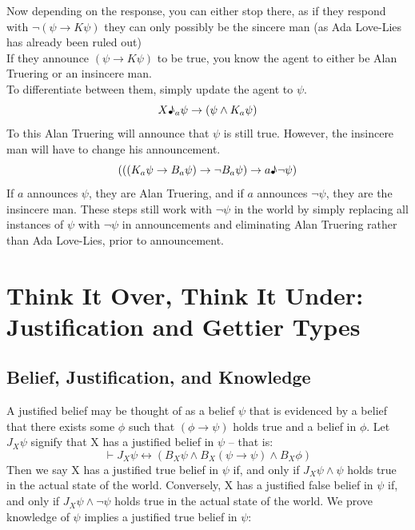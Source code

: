 \documentclass[12pt, titlepage, twoside, a4paper]{report}
\begin{document}
\newline \newline \newline \newline \newline \newline \newline \newline \newline
Now depending on the response, you can either stop there, as if they respond with $\neg (\psi \to K\psi)$ they can only possibly be the sincere man (as Ada Love-Lies has already been ruled out)\\
If they announce $(\psi \to K\psi)$ to be true, you know the agent to either be Alan Truering or an insincere man.\\
To differentiate between them, simply update the agent to $\psi$.
$$X\text{\textmusicalnote}_a \psi \to (\psi \wedge K_a \psi)$$
To this Alan Truering will announce that $\psi$ is still true. However, the insincere man will have to change his announcement.
$$(((K_a \psi \to B_a \psi ) \to \neg B_a \psi) \to a \text{\textmusicalnote} \neg \psi)$$
If $a$ announces $\psi$, they are Alan Truering, and if $a$ announces $\neg \psi$, they are the insincere man. These steps still work with $\neg \psi$ in the world by simply replacing all instances of $\psi$ with $\neg \psi$ in announcements and eliminating Alan Truering rather than Ada Love-Lies, prior to announcement.

\chapter{Think It Over, Think It Under: Justification and Gettier Types}
\section{Belief, Justification, and Knowledge}
A justified belief may be thought of as a belief $\psi$ that is evidenced by a belief that there exists some $\phi$ such that $(\phi \to \psi)$ holds true and a belief in $\phi$. Let $J_X\psi$ signify that X has a justified belief in $\psi$ – that is:
$$\vdash J_X\psi \leftrightarrow (B_X \psi \wedge B_X(\psi \to \psi) \wedge B_X \phi)$$ 
Then we say X has a justified true belief in $\psi$ if, and only if $J_X\psi \wedge \psi$ holds true in the actual state of the world. Conversely, X has a justified false belief in $\psi$ if, and only if $J_X\psi \wedge \neg \psi$ holds true in the actual state of the world. 
We prove knowledge of $\psi$ implies a justified true belief in $\psi$:
\end{document}
